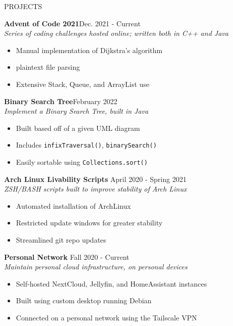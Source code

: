 \documentclass[UTF-8]{resume} \usepackage{multirow}
\begin{document}
\begin{rSection}{PROJECTS}
	\vspace{-1.5em}
\item \textbf{Advent of Code 2021}\hfill {Dec. 2021 - Current}\\
	\emph{Series of coding challenges hosted online; written both in C++ and Java}
	\begin{itemize}
          \itemsep -5pt {}
	       \item Manual implementation of Dijkstra's algorithm
	       \item plaintext file parsing
           \item Extensive Stack, Queue, and ArrayList use
	\end{itemize}
\item \textbf{Binary Search Tree}\hfill {February 2022} \\
    \emph{ Implement a Binary Search Tree, built in Java}
	\begin{itemize}
         \itemsep -5pt {}
	      \item Built based off of a given UML diagram
          \item Includes \verb|infixTraversal()|, \verb|binarySearch()|
          \item Easily sortable using \verb|Collections.sort()|
	\end{itemize}
\item \textbf{Arch Linux Livability Scripts} \hfill {April 2020 - Spring 2021}\\
	\emph{ZSH/BASH scripts built to improve stability of Arch Linux}
	\begin{itemize}
	    \itemsep -5pt {}
             \item Automated installation of ArchLinux
             \item Restricted update windows for greater stability
             \item Streamlined git repo updates
	\end{itemize}
\item \textbf{Personal Network} \hfill{Fall 2020 - Current}\\
	\emph{Maintain personal cloud infrastructure, on personal devices}
       \begin{itemize}
           \itemsep -5pt {}
	        \item Self-hosted NextCloud, Jellyfin, and HomeAssistant instances
		    \item Built using custom desktop running Debian
            \item Connected on a personal network using the Tailscale VPN
	\end{itemize}
\end{rSection}
\end{document}

